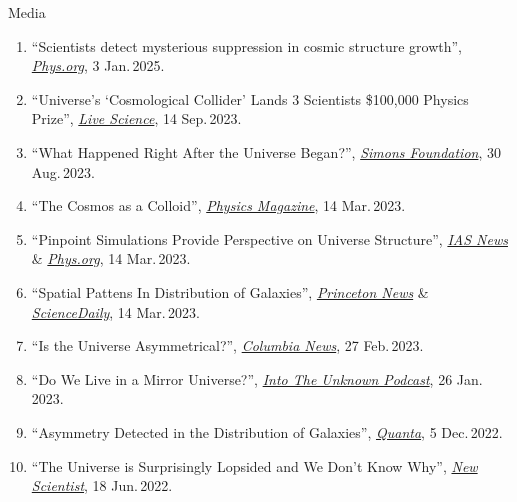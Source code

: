 \documentclass{resume} %
\begin{document}
\begin{rSection}{Media}

    \begin{enumerate}
       \item ``Scientists detect mysterious suppression in cosmic structure growth'', \href{https://phys.org/news/2025-01-scientists-mysterious-suppression-cosmic-growth.html}{\textit{Phys.org}}, 3 Jan.\,2025.
        \item ``Universe's `Cosmological Collider' Lands 3 Scientists \$100,000 Physics Prize'', \href{https://www.livescience.com/space/cosmology/universes-cosmological-collider-lands-3-scientists-dollar100000-physics-prize}{\textit{Live Science}}, 14 Sep.\,2023.
        \item ``What Happened Right After the Universe Began?'', \href{https://www.simonsfoundation.org/2023/08/30/what-happened-right-after-the-universe-began/}{\textit{Simons Foundation}}, 30 Aug.\,2023.
        \item ``The Cosmos as a Colloid'', \href{https://physics.aps.org/articles/v16/42}{\textit{Physics Magazine}}, 14 Mar.\,2023.
        \item ``Pinpoint Simulations Provide Perspective on Universe Structure'', \href{https://www.ias.edu/news/2023/pinpoint-universe}{\textit{IAS News}} \& \href{https://phys.org/news/2023-03-simulations-perspective-universe.html}{\textit{Phys.org}}, 14 Mar.\,2023.
        \item ``Spatial Pattens In Distribution of Galaxies'', \href{https://www.princeton.edu/news/2023/03/16/chemist-and-astrophysicist-team-uncover-spatial-patterns-distribution-galaxies}{\textit{Princeton News}} \& \href{www.sciencedaily.com/releases/2023/03/230314155038.htm}{\textit{ScienceDaily}}, 14 Mar.\,2023.
        \item ``Is the Universe Asymmetrical?'', \href{https://news.columbia.edu/news/universe-asymmetrical}{\textit{Columbia News}}, 27 Feb.\,2023.
        \item ``Do We Live in a Mirror Universe?'', \href{https://www.youtube.com/watch?v=y0_ePN7c1gw}{\textit{Into The Unknown Podcast}}, 26 Jan.\,2023. 
        \item ``Asymmetry Detected in the Distribution of Galaxies'', \href{https://www.quantamagazine.org/asymmetry-detected-in-the-distribution-of-galaxies-20221205/}{\textit{Quanta}}, 5 Dec.\,2022.
        \item ``The Universe is Surprisingly Lopsided and We Don't Know Why'', \href{https://institutions.newscientist.com/article/2324946-the-universe-is-surprisingly-lopsided-and-we-dont-know-why/}{\textit{New Scientist}}, 18 Jun.\,2022.
    \end{enumerate}
\end{rSection}
\end{document}
